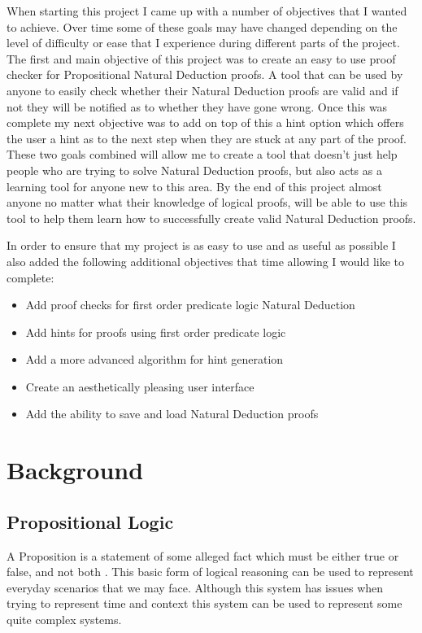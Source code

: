 When starting this project I came up with a number of objectives that I wanted to achieve. Over time some of these goals may have changed depending on the level of difficulty or ease that I experience during different parts of the project. The first and main objective of this project was to create an easy to use proof checker for Propositional Natural Deduction proofs. A tool that can be used by anyone to easily check whether their Natural Deduction proofs are valid and if not they will be notified as to whether they have gone wrong. Once this was complete my next objective was to add on top of this a hint option which offers the user a hint as to the next step when they are stuck at any part of the proof. These two goals combined will allow me to create a tool that doesn't just help people who are trying to solve Natural Deduction proofs, but also acts as a learning tool for anyone new to this area. By the end of this project almost anyone no matter what their knowledge of logical proofs, will be able to use this tool to help them learn how to successfully create valid Natural Deduction proofs.

In order to ensure that my project is as easy to use and as useful as possible I also added the following additional objectives that time allowing I would like to complete:
\begin{itemize}
\item Add proof checks for first order predicate logic Natural Deduction
\item Add hints for proofs using first order predicate logic
\item Add a more advanced algorithm for hint generation
\item Create an aesthetically pleasing user interface
\item Add the ability to save and load Natural Deduction proofs
\end{itemize}

\pagebreak

\section{Background \label{Background}}

\subsection{Propositional Logic}

A Proposition is a statement of some alleged fact which must be either true or false, and not both \cite{ndBook}. This basic form of logical reasoning can be used to represent everyday scenarios that we may face. Although this system has issues when trying to represent time and context this system can be used to represent some quite complex systems.

